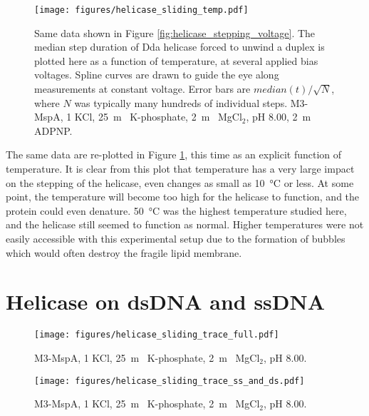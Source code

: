 \begin{figure}[h]
\begin{centering}
\texttt{[image: figures/helicase\_sliding\_temp.pdf]}
\caption[Forced helicase stepping depends on temperature]{Same data shown in Figure \ref{fig:helicase_stepping_voltage}.  The median step duration of Dda helicase forced to unwind a duplex is plotted here as a function of temperature, at several applied bias voltages.  Spline curves are drawn to guide the eye along measurements at constant voltage.  Error bars are $median(t)/\sqrt{N}$, where $N$ was typically many hundreds of individual steps.  M3-MspA, \SI{1}{\Molar} KCl, \SI{25}{\m\Molar} K-phosphate, \SI{2}{\m\Molar} MgCl$_2$, pH \num{8.00}, \SI{2}{\m\Molar} ADPNP.}
\label{fig:helicase_stepping_temp}
\end{centering}
\end{figure}

The same data are re-plotted in Figure \ref{fig:helicase_stepping_temp}, this time as an explicit function of temperature.  It is clear from this plot that temperature has a very large impact on the stepping of the helicase, even changes as small as \SI{10}{\celsius} or less.  At some point, the temperature will become too high for the helicase to function, and the protein could even denature.  \SI{50}{\celsius} was the highest temperature studied here, and the helicase still seemed to function as normal.  Higher temperatures were not easily accessible with this experimental setup due to the formation of bubbles which would often destroy the fragile lipid membrane.


\section{Helicase on dsDNA and ssDNA}

\begin{figure}[h]
\begin{centering}
\texttt{[image: figures/helicase\_sliding\_trace\_full.pdf]}
\caption[Forced helicase stepping depends on temperature]{M3-MspA, \SI{1}{\Molar} KCl, \SI{25}{\m\Molar} K-phosphate, \SI{2}{\m\Molar} MgCl$_2$, pH \num{8.00}.}
\label{fig:helicase_stepping_full_ss_ds}
\end{centering}
\end{figure}

\begin{figure}[h]
\begin{centering}
\texttt{[image: figures/helicase\_sliding\_trace\_ss\_and\_ds.pdf]}
\caption[Forced helicase stepping depends on temperature]{M3-MspA, \SI{1}{\Molar} KCl, \SI{25}{\m\Molar} K-phosphate, \SI{2}{\m\Molar} MgCl$_2$, pH \num{8.00}.}
\label{fig:helicase_stepping_ss_ds}
\end{centering}
\end{figure}

